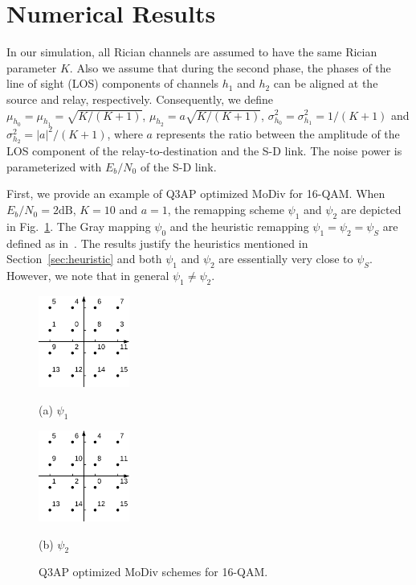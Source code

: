 \documentclass[journal]{IEEEtran}
\begin{document}
\section{Numerical Results}
\label{sec:simulation}
In our simulation, all Rician channels are assumed to have the same Rician
parameter $K$. Also we assume that during the second phase, the phases of the
line of sight (LOS) components of channels $h_1$ and $h_2$ can be aligned at the
source and relay, respectively.
Consequently, we define $\mu_{h_0} = \mu_{h_1} = \sqrt{K/(K + 1)}$,
$\mu_{h_2}=a\sqrt{K/(K + 1)}$,  $\sigma_{h_0}^2 = \sigma_{h_1}^2 = 1/(K+1)$ and
$\sigma_{h_2}^2 = |a|^2/(K+1)$, where $a$ represents the ratio
between the amplitude of the LOS component of the
relay-to-destination and the S-D link. The noise power is
parameterized with $E_b/N_0$ of the S-D link.

First, we provide an example of Q3AP optimized MoDiv for 16-QAM. When $E_b/N_0 =
2\mbox{dB}$, $K = 10$ and $a = 1$, the remapping scheme $\psi_1$ and $\psi_2$
are depicted in Fig.~\ref{fig:example}. The Gray mapping $\psi_0$ and the
heuristic remapping $\psi_1=\psi_2=\psi_S$ are defined as
in~\cite{seddik2008trans}. The results justify the heuristics mentioned in
Section~\ref{sec:heuristic} and both $\psi_1$ and $\psi_2$ are essentially very
close to $\psi_S$. However, we note that in general $\psi_1\not=\psi_2$.

\begin{figure}[!t]
    \begin{minipage}[b]{0.48\linewidth}
      \centering
      \centerline{\includegraphics[width=3.0cm]{./figs/psi1.eps}}
      \centerline{(a) $\psi_1$}\medskip
    \end{minipage}
    \hfill
    \begin{minipage}[b]{.48\linewidth}
      \centering
      \centerline{\includegraphics[width=3.0cm]{./figs/psi2.eps}}
      \centerline{(b) $\psi_2$}\medskip
    \end{minipage}
    \caption{Q3AP optimized MoDiv schemes for 16-QAM.}
    \label{fig:example}
\end{figure}
\end{document}
